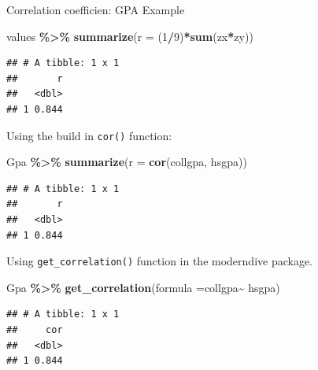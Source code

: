 \documentclass[
  ignorenonframetext,
]{beamer}
\newenvironment{Shaded}{\begin{snugshade}}{\end{snugshade}}
\newcommand{\AttributeTok}[1]{\textcolor[rgb]{0.13,0.29,0.53}{#1}}
\newcommand{\DecValTok}[1]{\textcolor[rgb]{0.00,0.00,0.81}{#1}}
\newcommand{\FunctionTok}[1]{\textcolor[rgb]{0.13,0.29,0.53}{\textbf{#1}}}
\newcommand{\NormalTok}[1]{#1}
\newcommand{\SpecialCharTok}[1]{\textcolor[rgb]{0.81,0.36,0.00}{\textbf{#1}}}
\begin{document}
\begin{frame}[fragile]{Correlation coefficien: GPA Example}
\protect\hypertarget{correlation-coefficien-gpa-example-3}{}
\tiny

\begin{Shaded}
\begin{Highlighting}[]
\NormalTok{values }\SpecialCharTok{\%\textgreater{}\%} 
  \FunctionTok{summarize}\NormalTok{(}\AttributeTok{r =}\NormalTok{ (}\DecValTok{1}\SpecialCharTok{/}\DecValTok{9}\NormalTok{)}\SpecialCharTok{*}\FunctionTok{sum}\NormalTok{(zx}\SpecialCharTok{*}\NormalTok{zy))}
\end{Highlighting}
\end{Shaded}

\begin{verbatim}
## # A tibble: 1 x 1
##       r
##   <dbl>
## 1 0.844
\end{verbatim}

\normalsize

Using the build in \texttt{cor()} function: \tiny

\begin{Shaded}
\begin{Highlighting}[]
\NormalTok{Gpa }\SpecialCharTok{\%\textgreater{}\%} 
  \FunctionTok{summarize}\NormalTok{(}\AttributeTok{r =} \FunctionTok{cor}\NormalTok{(collgpa, hsgpa))}
\end{Highlighting}
\end{Shaded}

\begin{verbatim}
## # A tibble: 1 x 1
##       r
##   <dbl>
## 1 0.844
\end{verbatim}

\normalsize

Using \texttt{get\_correlation()} function in the moderndive package.
\tiny

\begin{Shaded}
\begin{Highlighting}[]
\NormalTok{Gpa }\SpecialCharTok{\%\textgreater{}\%} 
  \FunctionTok{get\_correlation}\NormalTok{(}\AttributeTok{formula =}\NormalTok{collgpa}\SpecialCharTok{\textasciitilde{}}\NormalTok{ hsgpa)}
\end{Highlighting}
\end{Shaded}

\begin{verbatim}
## # A tibble: 1 x 1
##     cor
##   <dbl>
## 1 0.844
\end{verbatim}

\normalsize
\end{frame}
\end{document}
